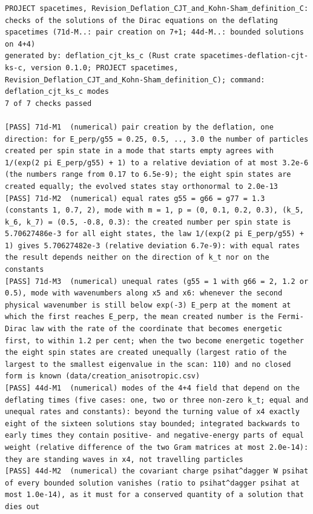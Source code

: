 \documentclass[
  10pt,
]{article}
\begin{document}
\begin{verbatim}
PROJECT spacetimes, Revision_Deflation_CJT_and_Kohn-Sham_definition_C: checks of the solutions of the Dirac equations on the deflating spacetimes (71d-M..: pair creation on 7+1; 44d-M..: bounded solutions on 4+4)
generated by: deflation_cjt_ks_c (Rust crate spacetimes-deflation-cjt-ks-c, version 0.1.0; PROJECT spacetimes, Revision_Deflation_CJT_and_Kohn-Sham_definition_C); command: deflation_cjt_ks_c modes
7 of 7 checks passed

[PASS] 71d-M1  (numerical) pair creation by the deflation, one direction: for E_perp/g55 = 0.25, 0.5, .., 3.0 the number of particles created per spin state in a mode that starts empty agrees with 1/(exp(2 pi E_perp/g55) + 1) to a relative deviation of at most 3.2e-6 (the numbers range from 0.17 to 6.5e-9); the eight spin states are created equally; the evolved states stay orthonormal to 2.0e-13
[PASS] 71d-M2  (numerical) equal rates g55 = g66 = g77 = 1.3 (constants 1, 0.7, 2), mode with m = 1, p = (0, 0.1, 0.2, 0.3), (k_5, k_6, k_7) = (0.5, -0.8, 0.3): the created number per spin state is 5.70627486e-3 for all eight states, the law 1/(exp(2 pi E_perp/g55) + 1) gives 5.70627482e-3 (relative deviation 6.7e-9): with equal rates the result depends neither on the direction of k_t nor on the constants
[PASS] 71d-M3  (numerical) unequal rates (g55 = 1 with g66 = 2, 1.2 or 0.5), mode with wavenumbers along x5 and x6: whenever the second physical wavenumber is still below exp(-3) E_perp at the moment at which the first reaches E_perp, the mean created number is the Fermi-Dirac law with the rate of the coordinate that becomes energetic first, to within 1.2 per cent; when the two become energetic together the eight spin states are created unequally (largest ratio of the largest to the smallest eigenvalue in the scan: 110) and no closed form is known (data/creation_anisotropic.csv)
[PASS] 44d-M1  (numerical) modes of the 4+4 field that depend on the deflating times (five cases: one, two or three non-zero k_t; equal and unequal rates and constants): beyond the turning value of x4 exactly eight of the sixteen solutions stay bounded; integrated backwards to early times they contain positive- and negative-energy parts of equal weight (relative difference of the two Gram matrices at most 2.0e-14): they are standing waves in x4, not travelling particles
[PASS] 44d-M2  (numerical) the covariant charge psihat^dagger W psihat of every bounded solution vanishes (ratio to psihat^dagger psihat at most 1.0e-14), as it must for a conserved quantity of a solution that dies out

\end{verbatim}
\end{document}
